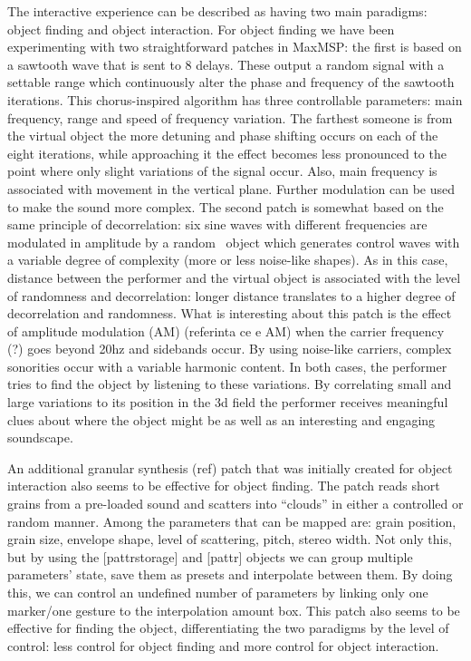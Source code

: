 \documentclass{nime-alternate}
\begin{document}
The interactive experience can be described as having two main paradigms: object finding and object interaction. For object finding we have been experimenting with two straightforward patches in MaxMSP: the first is based on a sawtooth wave that is sent to 8 delays. These output a random signal with a settable range which continuously alter the phase and frequency of the sawtooth iterations. This chorus-inspired algorithm has three controllable parameters: main frequency, range and speed of frequency variation. The farthest someone is from the virtual object the more detuning and phase shifting occurs on each of the eight iterations, while approaching it the effect becomes less pronounced to the point where only slight variations of the signal occur. Also, main frequency is associated with movement in the vertical plane. Further modulation can be used to make the sound more complex. The second patch is somewhat based on the same principle of decorrelation: six sine waves with different frequencies are modulated in amplitude by a random~ object which generates control waves with a variable degree of complexity (more or less noise-like shapes). As in this case, distance between the performer and the virtual object is associated with the level of randomness and decorrelation: longer distance translates to a higher degree of decorrelation and randomness. What is interesting about this patch is the effect of amplitude modulation (AM) (referinta ce e AM) when the carrier frequency (?) goes beyond 20hz and sidebands occur. By using noise-like carriers, complex sonorities occur with a variable harmonic content. In both cases, the performer tries to find the object by listening to these variations. By correlating small and large variations to its position in the 3d field the performer receives meaningful clues about where the object might be as well as an interesting and engaging soundscape. 

An additional granular synthesis (ref) patch that was initially created for object interaction also seems to be effective for object finding. The patch reads short grains from a pre-loaded sound and scatters into “clouds” in either a controlled or random manner. Among the parameters that can be mapped are: grain position, grain size, envelope shape, level of scattering, pitch, stereo width. Not only this, but by using the [pattrstorage] and [pattr] objects we can group multiple parameters’ state, save them as presets and interpolate between them. By doing this, we can control an undefined number of parameters by linking only one marker/one gesture to the interpolation amount box. This patch also seems to be effective for finding the object, differentiating the two paradigms by the level of control: less control for object finding and more control for object interaction.
\end{document}
